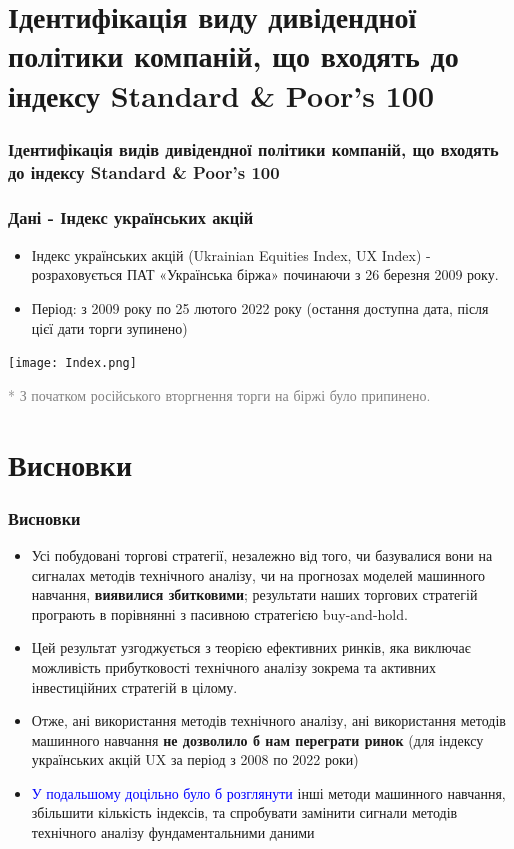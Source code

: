 \documentclass[aspectratio=169]{beamer}
\begin{document}
\section{Ідентифікація виду дивідендної політики компаній, що входять до індексу Standard \& Poor's 100}
\begin{frame}
\frametitle{Ідентифікація видів дивідендної політики компаній, що входять до індексу Standard \& Poor's 100}

\end{frame}

\begin{frame}
\frametitle{Дані - Індекс  українських  акцій}
\begin{center}
\begin{itemize}
\item \alert {Індекс  українських  акцій}  (Ukrainian  Equities  Index,  UX  Index) - розраховується ПАТ «Українська біржа» починаючи з 26 березня 2009 року.
\smallskip
\item  \alert {Період:} з 2009 року по 25 лютого 2022 року (остання доступна дата, після цієї дати 
торги  зупинено)
\end{itemize}
\tinyskip
\texttt{[image: Index.png]}
\tinyskip
\end{center}
\scriptsize \textcolor{gray}{* З  початком  російського  вторгнення  торги  на  біржі було  припинено.} 
\end{frame}

\section{Висновки}

\begin{frame}
\frametitle{Висновки}
\begin{itemize}
\item Усі побудовані торгові стратегії, незалежно від того, чи базувалися вони на 
сигналах  методів  технічного  аналізу,  чи  на  прогнозах  моделей  машинного навчання, \alert {\textbf{виявилися збитковими}}; результати наших торгових стратегій програють в порівнянні з пасивною  стратегією  buy-and-hold.  
\bigskip
\item Цей  результат  узгоджується  з  теорією ефективних ринків, яка виключає можливість прибутковості технічного аналізу зокрема та активних інвестиційних стратегій в цілому.
\bigskip
\item Отже, ані використання методів технічного аналізу, ані використання методів машинного навчання \alert {\textbf{не дозволило б нам переграти ринок}} (для індексу українських акцій UX за період з 2008 по 2022 роки)
\bigskip
{}
\item \textcolor{blue} {У подальшому доцільно було б розглянути} інші  методи  машинного навчання, збільшити кількість індексів, та спробувати замінити сигнали  методів технічного  аналізу  фундаментальними даними
\bigskip
\end{itemize}
\end{frame}
\end{document}

